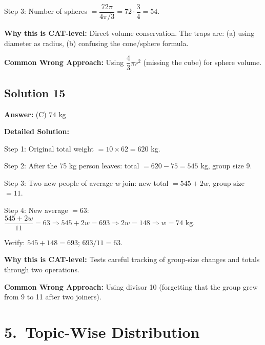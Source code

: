 \documentclass[11pt]{article}
\begin{document}
Step 3: Number of spheres \(= \dfrac{72\pi}{4\pi/3} = 72 \cdot \dfrac{3}{4} = 54\).

\textbf{Why this is CAT-level:}
Direct volume conservation. The traps are: (a) using diameter as radius, (b) confusing the cone/sphere formula.

\textbf{Common Wrong Approach:}
Using \(\dfrac{4}{3}\pi r^2\) (missing the cube) for sphere volume.

\subsection*{Solution 15}
\textbf{Answer:} (C) \(74\) kg

\textbf{Detailed Solution:}

Step 1: Original total weight \(= 10 \times 62 = 620\) kg.

Step 2: After the 75 kg person leaves: total \(= 620 - 75 = 545\) kg, group size 9.

Step 3: Two new people of average \(w\) join: new total \(= 545 + 2w\), group size \(= 11\).

Step 4: New average \(= 63\): \(\dfrac{545 + 2w}{11} = 63\Rightarrow 545 + 2w = 693\Rightarrow 2w = 148\Rightarrow w = 74\) kg.

Verify: \(545 + 148 = 693\); \(693 / 11 = 63\). \checkmark

\textbf{Why this is CAT-level:}
Tests careful tracking of group-size changes and totals through two operations.

\textbf{Common Wrong Approach:}
Using divisor 10 (forgetting that the group grew from 9 to 11 after two joiners).

\newpage
\section*{5.\ Topic-Wise Distribution}
\end{document}
